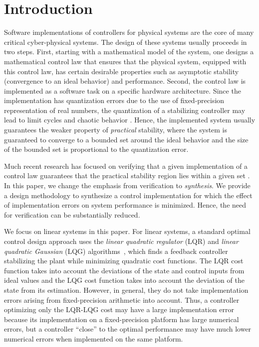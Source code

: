 \documentclass{amsart}
\numberwithin{equation}{section}
\begin{document}
\maketitle

\section{Introduction}

Software implementations of controllers for physical systems are the core of
many critical cyber-physical systems.
The design of these systems usually proceeds in two steps.
First, starting with a mathematical model of the system, one designs a
mathematical control law 
that ensures that the physical system, equipped with this control law, has certain
desirable properties such as asymptotic stability (convergence to an ideal behavior)
and performance.
Second, the control law is implemented as a software task on a specific hardware architecture.
Since the implementation has quantization errors due to the use of 
fixed-precision representation of real numbers, the quantization of a stabilizing controller may 
lead to limit cycles and chaotic behavior \cite{kalman}. Hence, the implemented system usually 
guarantees the weaker property of {\em practical} stability,
where the system is guaranteed to converge to a bounded set around the ideal behavior
and the size of the bounded set is proportional to the quantization error. 

Much recent research has focused on verifying that
a given implementation of a control law
guarantees that the practical stability region lies within a given set
\cite{PodelskiW06,PodelskiW07,feron_journal,anta,DM11}.
In this paper, we change the emphasis from verification to {\em synthesis}.
We provide a design methodology to synthesize a control implementation for which 
the effect of implementation errors on system performance is minimized. 
Hence, the need for verification can be substantially reduced.

We focus on linear systems in this paper.
For linear systems, a standard optimal control design approach uses 
the {\em linear quadratic regulator} (LQR) and {\em linear quadratic Gaussian} (LQG) algorithms~\cite{joao}, 
which finds a feedback controller stabilizing the plant while minimizing quadratic cost functions. 
The LQR cost function takes into account the deviations of the state and control inputs from ideal
values and the LQG cost function takes into account the deviation of the state from its estimation. 
However, in general, they do not take implementation errors arising from
fixed-precision arithmetic into account.
Thus, a controller optimizing only the LQR-LQG cost may have a large implementation error
because its implementation on a fixed-precision platform has large numerical
errors, but a controller ``close'' to the optimal performance may have much lower
numerical errors when implemented on the same platform.
\end{document}
